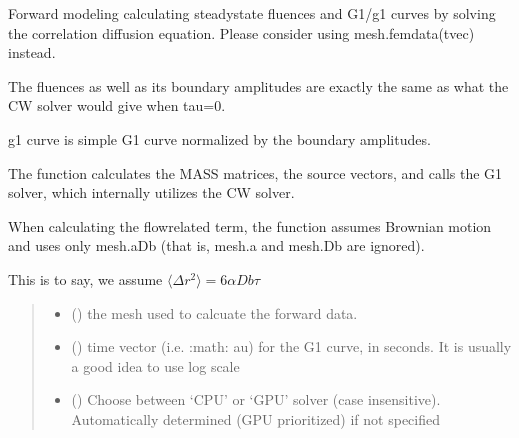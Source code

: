 \documentclass[letterpaper,10pt,english]{sphinxmanual}
\begin{document}
\begin{fulllineitems}
\label{\detokenize{_autosummary/nirfasterff.forward.femdata.femdata_DCS:nirfasterff.forward.femdata.femdata_DCS}}
\pysigstartsignatures
{}
\pysigstopsignatures
\sphinxAtStartPar
Forward modeling calculating steady\sphinxhyphen{}state fluences and G1/g1 curves by solving the correlation diffusion equation. Please consider using mesh.femdata(tvec) instead.

\sphinxAtStartPar
The fluences as well as its boundary amplitudes are exactly the same as what the CW solver would give when tau=0.

\sphinxAtStartPar
g1 curve is simple G1 curve normalized by the boundary amplitudes.

\sphinxAtStartPar
The function calculates the MASS matrices, the source vectors, and calls the G1 solver, which internally utilizes the CW solver.

\sphinxAtStartPar
When calculating the flow\sphinxhyphen{}related term, the function assumes Brownian motion and uses only mesh.aDb (that is, mesh.a and mesh.Db are ignored).

\sphinxAtStartPar
This is to say, we assume \(\langle\Delta r^2\rangle=6\alpha Db\tau\)
\begin{quote}\begin{description}
\begin{itemize}
\item {} 
\sphinxAtStartPar
{} () \textendash{} the mesh used to calcuate the forward data.

\item {} 
\sphinxAtStartPar
{} () \textendash{} time vector (i.e. :math:\textasciigrave{}       au\textasciigrave{}) for the G1 curve, in seconds. It is usually a good idea to use log scale

\item {} 
\sphinxAtStartPar
{} (\sphinxstyleliteralemphasis{\sphinxupquote{, }}) \textendash{} Choose between ‘CPU’ or ‘GPU’ solver (case insensitive). Automatically determined (GPU prioritized) if not specified


\end{itemize}
\end{description}
\end{quote}
\end{fulllineitems}
\end{document}
